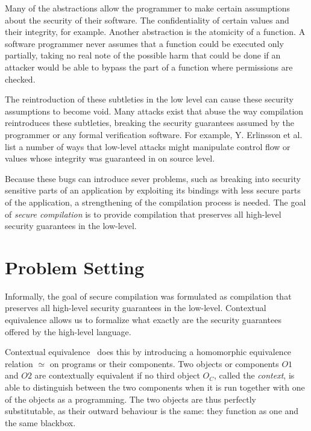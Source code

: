 \documentclass[11pt]{article}
\begin{document}
Many of the abstractions allow the programmer to make certain assumptions about the security of their software.
The confidentiality of certain values and their integrity, for example.
Another abstraction is the atomicity of a function.
A software programmer never assumes that a function could be executed only partially, taking no real note of the possible harm that could be done if an attacker would be able to bypass the part of a function where permissions are checked.

The reintroduction of these subtleties in the low level can cause these security assumptions to become void.
Many attacks exist that abuse the way compilation reintroduces these subtleties, breaking the security guarantees assumed by the programmer or any formal verification software.
For example, Y. Erlinsson et al.~\cite{OVSPaper} list a number of ways that low-level attacks might manipulate control flow or values whose integrity was guaranteed in on source level.

Because these bugs can introduce sever problems, such as breaking into security sensitive parts of an application by exploiting its bindings with less secure parts %
of the application,
a strengthening of the compilation process is needed.
The goal of \emph{secure compilation} is to provide compilation that preserves all high-level security guarantees in the low-level.

\section{Problem Setting}
Informally, the goal of secure compilation was formulated as compilation that preserves all high-level security guarantees in the low-level.
Contextual equivalence allows us to formalize what exactly are the security guarantees offered by the high-level language.

Contextual equivalence~\cite{Agten:2012:SCM:2354412.2355247} does this by introducing a homomorphic equivalence relation $\simeq$ on programs or their components.
Two objects or components $O1$ and $O2$ are contextually equivalent if no third object $O_C$, called the \emph{context}, is able to distinguish between the two components when it is run together with one of the objects as a programming.
The two objects are thus perfectly substitutable, as their outward behaviour is the same: they function as one and the same blackbox.
\end{document}
